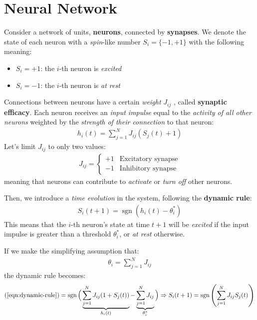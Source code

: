 \documentclass[../template.tex]{subfiles}
\begin{document}
\section{Neural Network}
Consider a network of units, \textbf{neurons}, connected by \textbf{synapses}. We denote the state of each neuron with a \textit{spin}-like number $S_i = \{-1,+1\}$ with the following meaning:
\begin{itemize}
    \item $S_i = +1$: the $i$-th neuron is \textit{excited} 
    \item $S_i = -1$: the $i$-th neuron is \textit{at rest}     
\end{itemize}
Connections between neurons have a certain \textit{weight} $J_{ij}$ , called \textbf{synaptic efficacy}. Each neuron receives an \textit{input impulse} equal to the \textit{activity of all other neurons} weighted by the \textit{strength of their connection} to that neuron: 
\begin{align*}
    h_i(t) = \sum_{j=1}^N J_{ij} (S_j(t) + 1)
\end{align*}   
Let's limit $J_{ij}$ to only two values:
\begin{align*}
    J_{ij} = \begin{cases}
        +1 & \text{Excitatory synapse}\\
        -1 & \text{Inhibitory synapse}
    \end{cases}
\end{align*} 
meaning that neurons can contribute to \textit{activate} or \textit{turn off} other neurons.

Then, we introduce a \textit{time evolution} in the system, following the \textbf{dynamic rule}:
\begin{align}
    S_i(t+1) = \operatorname{sgn}(h_i(t) - \theta^*_i) 
    \label{eqn:dynamic-rule}
\end{align}  
This means that the $i$-th neuron's state at time $t+1$ will be \textit{excited} if the input impulse is greater than a threshold $\theta^*_i$, or \textit{at rest} otherwise.

If we make the simplifying assumption that:
\begin{align*}
    \theta_i = \sum_{j=1}^N J_{ij}
\end{align*}
the dynamic rule becomes:
\begin{align*}
    (\ref{eqn:dynamic-rule}) = \operatorname{sgn} \Big(\underbrace{\sum_{j=1}^N J_{ij} (1+ S_j(t))}_{h_i(t)}  - \underbrace{\sum_{j=1}^N J_{ij}}_{\theta^*_i} \Big) \Rightarrow S_i(t+1) = \operatorname{sgn}\left(\sum_{j=1}^N J_{ij} S_j(t)\right) 
\end{align*}
\end{document}
